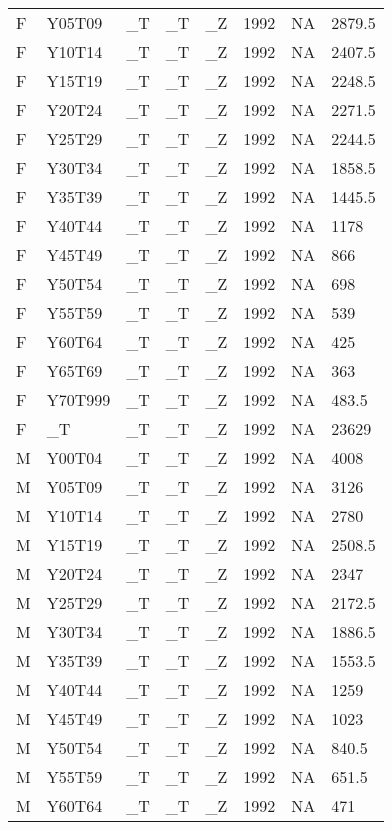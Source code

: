 \begin{longtable}[t]{llllllll}
F & Y05T09 & \_T & \_T & \_Z & 1992 & NA & 2879.5\\
F & Y10T14 & \_T & \_T & \_Z & 1992 & NA & 2407.5\\
\addlinespace
F & Y15T19 & \_T & \_T & \_Z & 1992 & NA & 2248.5\\
F & Y20T24 & \_T & \_T & \_Z & 1992 & NA & 2271.5\\
F & Y25T29 & \_T & \_T & \_Z & 1992 & NA & 2244.5\\
F & Y30T34 & \_T & \_T & \_Z & 1992 & NA & 1858.5\\
F & Y35T39 & \_T & \_T & \_Z & 1992 & NA & 1445.5\\
\addlinespace
F & Y40T44 & \_T & \_T & \_Z & 1992 & NA & 1178\\
F & Y45T49 & \_T & \_T & \_Z & 1992 & NA & 866\\
F & Y50T54 & \_T & \_T & \_Z & 1992 & NA & 698\\
F & Y55T59 & \_T & \_T & \_Z & 1992 & NA & 539\\
F & Y60T64 & \_T & \_T & \_Z & 1992 & NA & 425\\
\addlinespace
F & Y65T69 & \_T & \_T & \_Z & 1992 & NA & 363\\
F & Y70T999 & \_T & \_T & \_Z & 1992 & NA & 483.5\\
F & \_T & \_T & \_T & \_Z & 1992 & NA & 23629\\
M & Y00T04 & \_T & \_T & \_Z & 1992 & NA & 4008\\
M & Y05T09 & \_T & \_T & \_Z & 1992 & NA & 3126\\
\addlinespace
M & Y10T14 & \_T & \_T & \_Z & 1992 & NA & 2780\\
M & Y15T19 & \_T & \_T & \_Z & 1992 & NA & 2508.5\\
M & Y20T24 & \_T & \_T & \_Z & 1992 & NA & 2347\\
M & Y25T29 & \_T & \_T & \_Z & 1992 & NA & 2172.5\\
M & Y30T34 & \_T & \_T & \_Z & 1992 & NA & 1886.5\\
\addlinespace
M & Y35T39 & \_T & \_T & \_Z & 1992 & NA & 1553.5\\
M & Y40T44 & \_T & \_T & \_Z & 1992 & NA & 1259\\
M & Y45T49 & \_T & \_T & \_Z & 1992 & NA & 1023\\
M & Y50T54 & \_T & \_T & \_Z & 1992 & NA & 840.5\\
M & Y55T59 & \_T & \_T & \_Z & 1992 & NA & 651.5\\
\addlinespace
M & Y60T64 & \_T & \_T & \_Z & 1992 & NA & 471\\

\end{longtable}
